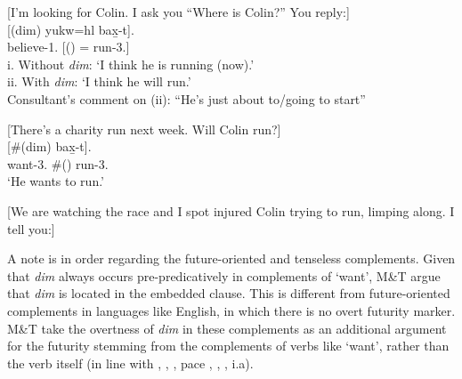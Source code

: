 \documentclass[output=paper]{langscibook}
\begin{document}
\begin{exe}
\ex \label{Todoro19} [I’m looking for Colin. I ask you ``Where is Colin?'' You reply:] \\
 	[({dim})	{yukw=hl}	{bax̱-t}].  \\
    believe-1{\sg}.{\seriesII}	[()	={\cn}	run-3.{\seriesII}]\\
\glt 	i. 	Without {\emph{dim}}:	‘I think he is running (now).’ \\
		ii. 	With {\emph{dim}}:	‘I think he will run.’  \\
		Consultant’s comment on (ii): ``He’s just about to/going to start''

\ex \label{Todoro20} [There’s a charity run next week. Will Colin run?] \\
	[\#({dim})	{bax̱-t}].	 \\
    want-3.{\seriesII}	 \#()	run-3.{\seriesII}\\
\glt `He wants to run.' 

\ex \label{Todoro21} [We are watching the race and I spot injured Colin trying to run, limping along. I tell you:] 
\begin{xlist}




\end{xlist}
\end{exe}

A note is in order regarding the future-oriented and tenseless complements. Given that \emph{dim} always occurs pre-predicatively in complements of ‘want’, M\&T argue that \emph{dim} is located in the embedded clause. This is different from future-oriented complements in languages like English, in which there is no overt futurity marker. M\&T take the overtness of \emph{dim} in these complements as an additional argument for the futurity stemming from the complements of verbs like `want', rather than the verb itself (in line with \citealt{abusch2004a}, \citealt{wurmbrand2014a}, \citealt{todoroviwurmbrand2020b}, pace \citealt{ogihara1996a}, \citealt{abusch1997a}, \citealt{pearson2017a}, i.a).	
\end{document}
